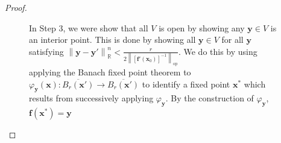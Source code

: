 \documentclass{article}
\newcommand{\R}{\mathbb{R}}
\newcommand{\x}{\mathbf{x}}
\newcommand{\f}{\mathbf{f}}
\newcommand{\y}{\mathbf{y}}
\newcommand{\norm}[1]{\left\lVert#1\right\rVert}
\newcommand{\normop}[1]{\left\lVert#1\right\rVert_\text{op}}
\theoremstyle{definition}
\begin{document}
\begin{proof}
\begin{enumerate}
\begin{figure}[h!]
				\caption{In Step 3, we were show that all $ V $ is open by showing any $ \y\in V $ is an interior point. This is done by showing all $ \y\in V $ for all $ \y $ satisfying $ \norm{\y-\y'}_\R^n <\frac{r}{2\normop{[\f'(\x_0)]^{-1}}}  $. We do this by using applying the Banach fixed point theorem to $ \varphi_\y(\x):\overline{B_r(\x')}\to \overline{B_r(\x')} $ to identify a fixed point $ \x^* $ which results from successively applying $ \varphi_\y $. By the construction of $ \varphi_\y $, $ \f(\x^*)=\y $ }
			\end{figure}
			

\end{enumerate}
\end{proof}
\end{document}
